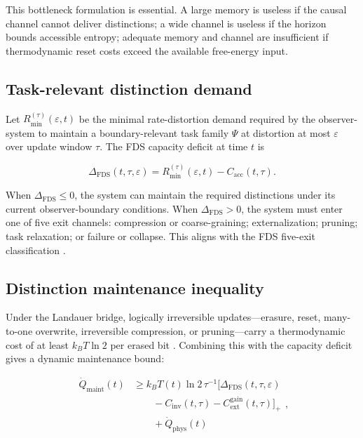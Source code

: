 \documentclass[10pt,a4paper,twocolumn,aps,prl]{revtex4-2}
\begin{document}
This bottleneck formulation is essential. A large memory is useless if the causal channel cannot deliver distinctions; a wide channel is useless if the horizon bounds accessible entropy; adequate memory and channel are insufficient if thermodynamic reset costs exceed the available free-energy input.

\subsection{Task-relevant distinction demand}

Let $R_{\min}^{(\tau)}(\varepsilon,t)$ be the minimal rate-distortion demand required by the observer-system to maintain a boundary-relevant task family $\Psi$ at distortion at most $\varepsilon$ over update window $\tau$. The FDS capacity deficit at time $t$ is

\begin{equation}
\Delta_{\mathrm{FDS}}(t,\tau,\varepsilon)
=
R_{\min}^{(\tau)}(\varepsilon,t)
-
C_{\mathrm{acc}}(t,\tau).
\label{eq:fds-deficit}
\end{equation}

When $\Delta_{\mathrm{FDS}}\leq 0$, the system can maintain the required distinctions under its current observer-boundary conditions. When $\Delta_{\mathrm{FDS}}>0$, the system must enter one of five exit channels: compression or coarse-graining; externalization; pruning; task relaxation; or failure or collapse. This aligns with the FDS five-exit classification \cite{wufdsagency2026}.

\subsection{Distinction maintenance inequality}

Under the Landauer bridge, logically irreversible updates---erasure, reset, many-to-one overwrite, irreversible compression, or pruning---carry a thermodynamic cost of at least $k_BT\ln2$ per erased bit \cite{landauer1961,bennett1982,berut2012}. Combining this with the capacity deficit gives a dynamic maintenance bound:

\begin{equation}
\boxed{
\begin{aligned}
\dot Q_{\mathrm{maint}}(t)
&\geq
k_B T(t)\ln 2\,\tau^{-1}
\bigl[ \Delta_{\mathrm{FDS}}(t,\tau,\varepsilon) \\
&\qquad - C_{\mathrm{inv}}(t,\tau)
- C_{\mathrm{ext}}^{\mathrm{gain}}(t,\tau)
\bigr]_+ \\
&\qquad + \dot Q_{\mathrm{phys}}(t)
\end{aligned}
},
\label{eq:maintenance-bound}
\end{equation}
\end{document}
